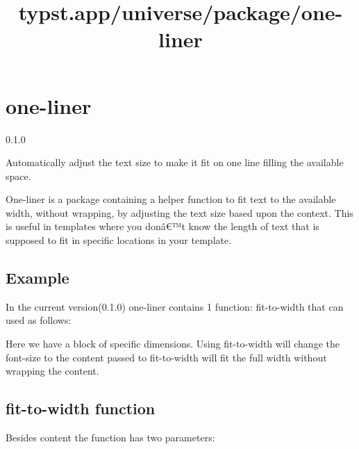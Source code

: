 \title{typst.app/universe/package/one-liner}

\label{banner}
\section{one-liner}\label{one-liner}

{ 0.1.0 }

Automatically adjust the text size to make it fit on one line filling
the available space.

\label{readme}
One-liner is a package containing a helper function to fit text to the
available width, without wrapping, by adjusting the text size based upon
the context. This is useful in templates where you donâ€™t know the
length of text that is supposed to fit in specific locations in your
template.

\subsection{Example}\label{example}

In the current version(0.1.0) one-liner contains 1 function:
fit-to-width that can used as follows:

\begin{Shaded}
\begin{Highlighting}[]

\NormalTok{)}
\end{Highlighting}
\end{Shaded}

Here we have a block of specific dimensions. Using fit-to-width will
change the font-size to the content passed to fit-to-width will fit the
full width without wrapping the content.


\subsection{fit-to-width function}\label{fit-to-width-function}

Besides content the function has two parameters:

